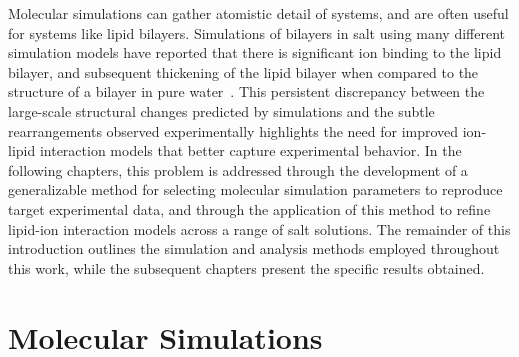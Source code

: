 Molecular simulations can gather atomistic detail of systems, and are often useful for systems like lipid bilayers. Simulations of bilayers
in salt using many different simulation models 
have reported that there is significant ion binding to the lipid bilayer, and subsequent 
thickening of the lipid bilayer when compared to the structure 
of a bilayer in pure 
water~\cite{Bockmann:2003,cordomi:2008,gurtovenko:2008,Cordomi:2009,jurkiewicz:2012,pandit:2008:simulationtextbook,kruczek:2017,kruczek:2019,saunders:2019}.
This persistent discrepancy between the large-scale structural changes predicted by 
simulations and the subtle rearrangements observed experimentally highlights the need for improved 
ion-lipid interaction models that better capture experimental behavior. 
In the following chapters, this problem is addressed through the development of a generalizable 
method for selecting molecular simulation parameters to reproduce target experimental data, and through 
the application of this method to refine lipid-ion interaction models across a range of salt solutions. 
The remainder of this introduction outlines the simulation and analysis methods employed throughout this work, 
while the subsequent chapters present the specific results obtained.


\section{Molecular Simulations}
